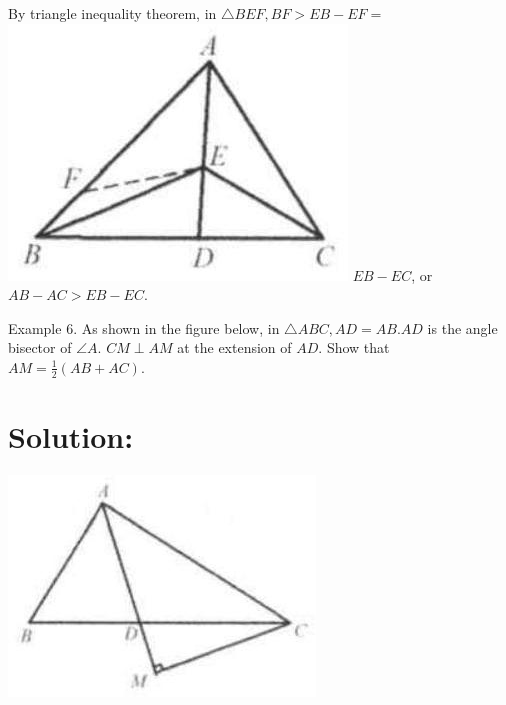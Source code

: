 \documentclass[10pt]{article}
\begin{document}
By triangle inequality theorem, in \(\triangle B E F, B F>E B-E F=\)\\
\includegraphics[max width=\textwidth]{2025_04_17_97bc1f7e44d93c271a88g-057(1)} \(E B-E C\), or \(A B-A C>E B-E C\).

Example 6. As shown in the figure below, in \(\triangle A B C, A D=A B . A D\) is the angle bisector of \(\angle A\). \(C M \perp A M\) at the extension of \(A D\). Show that \(A M=\frac{1}{2}(A B+A C)\).

\section*{Solution:}
\begin{center}
\includegraphics[max width=\textwidth]{2025_04_17_97bc1f7e44d93c271a88g-057(3)}
\end{center}
\end{document}
